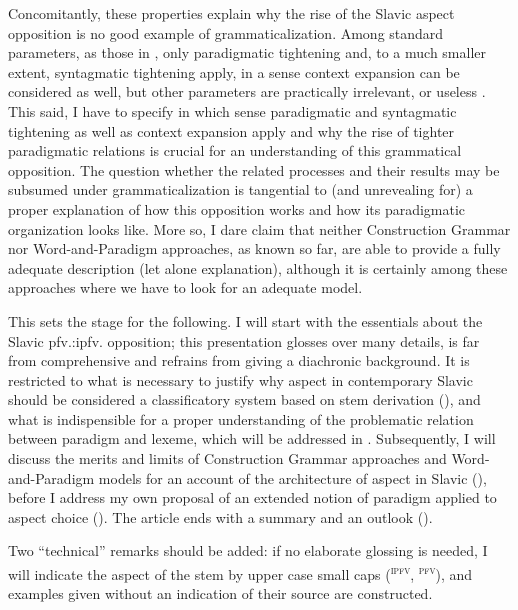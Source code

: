 \documentclass[output=paper]{langscibook}
\begin{document}
Concomitantly, these properties explain why the rise of the Slavic aspect opposition is no good example of grammaticalization. Among standard parameters, as those in \citet{Lehmann1995, HeineKuteva2002, Himmelmann2004}, only paradigmatic tightening and, to a much smaller extent, syntagmatic tightening apply, in a sense context expansion can be considered as well, but other parameters are practically irrelevant, or useless \parencites[Ch. 6]{Wiemer2002}{Wiemer2008}[267--270]{Wiemer2020a}{WiemerSerzant2017}. This said, I have to specify in which sense paradigmatic and syntagmatic tightening as well as context expansion apply and why the rise of tighter paradigmatic relations is crucial for an understanding of this grammatical opposition. The question whether the related processes and their results may be subsumed under grammaticalization is tangential to (and unrevealing for) a proper explanation of how this opposition works and how its paradigmatic organization looks like. More so, I dare claim that neither Construction Grammar nor Word-and-Paradigm approaches, as known so far, are able to provide a fully adequate description (let alone explanation), although it is certainly among these approaches where we have to look for an adequate model.

This sets the stage for the following. I will start with the essentials about the Slavic pfv.:ipfv. opposition; this presentation glosses over many details, is far from comprehensive and refrains from giving a diachronic background. It is restricted to what is necessary to justify why aspect in contemporary Slavic should be considered a classificatory system based on stem derivation (), and what is indispensible for a proper understanding of the problematic relation between paradigm and lexeme, which will be addressed in . Subsequently, I will discuss the merits and limits of Construction Grammar approaches and Word-and-Paradigm models for an account of the architecture of aspect in Slavic (), before I address my own proposal of an extended notion of paradigm applied to aspect choice (). The article ends with a summary and an outlook ().

Two “technical” remarks should be added: if no elaborate glossing is needed, I will indicate the aspect of the stem by upper case small caps (\textsc{\textsuperscript{ipfv}}, \textsc{\textsuperscript{pfv}}), and examples given without an indication of their source are constructed.
\end{document}
